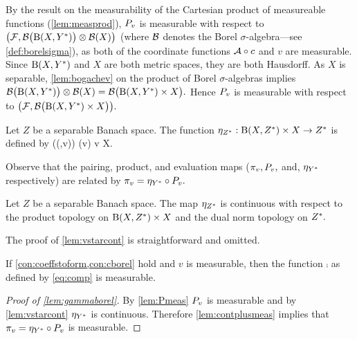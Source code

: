 By the result on the measurability of the Cartesian product of measureable functions (\cref{lem:measprod}), $P_{v}$ is measurable with respect to $\big(\cF,\bigBorel{\homspace}\otimes \Borel{X}\big)$ (where $\mathcal B$ denotes the Borel $\sigma$-algebra---see \cref{def:borelsigma}), as both of the coordinate functions $\mathcal A\circ c$ and $v$ are measurable. Since $\homspace$ and $X$ are both metric spaces, they are both Hausdorff. As $X$ is separable, \cref{lem:bogachev} on the product of Borel $\sigma$-algebras implies $\bigBorel{\homspace} \otimes \Borel{X} = \bigBorel{\homspace \times X}.$ Hence $P_{v}$ is measurable with respect to $\big(\cF,\bigBorel{\homspace\times X}\big).$
\epf

Let $Z$ be a separable Banach space. The function $\eval:\homspaceZ \times X \rightarrow \Zs$ is defined by
\beq\label{eq:evaldef}
\eval\big(\mleft(\cH,v\mright)\big) \de \cH(v) \quad\tfor \cH \in \homspaceZ \tand v \in X.
\eeq
\ede

Observe that the pairing, product, and evaluation maps ($\pi_{v}, P_{v},$ and, $\eta_{Y^{*}}$ respectively) are related by $\pi_{v} = \eta_{Y^{*}} \circ P_{v}.$

\label{lem:vstarcont}
Let $Z$ be a separable Banach space. The map $\eta_{Z^{*}}$ is continuous with respect to the product topology on $\homspaceZ \times X$ and the dual norm topology on $Z^{*}.$
\ele

The proof of \cref{lem:vstarcont} is straightforward and omitted.

 \label{lem:gammaborel}
If  \cref{con:coeffstoform,con:cborel} hold and $v$ is measurable, then the function $\comp$ as defined by \eqref{eq:comp} is measurable.
\ele

\begin{proof}[Proof of \cref{lem:gammaborel}]
By \cref{lem:Pmeas} $P_{v}$ is measurable
 and by \cref{lem:vstarcont} $\eta_{Y^{*}}$ is continuous. Therefore \cref{lem:contplusmeas} implies that $\pi_{v} = \eta_{Y^{*}} \circ P_{v}$ is measurable.
 \end{proof}



